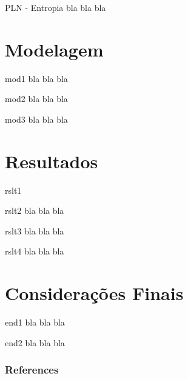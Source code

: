 \documentclass{beamer}
\begin{document}
    \begin{frame}{PLN - Entropia}
        bla bla bla
    \end{frame}

\section{Modelagem}
    \begin{frame}{mod1}
        bla bla bla
    \end{frame}

    \begin{frame}{mod2}
        bla bla bla
    \end{frame}

    \begin{frame}{mod3}
        bla bla bla
    \end{frame}


\section{Resultados}
    \begin{frame}{rslt1}
        \citep{agarwala2017}
    \end{frame}
    
    \begin{frame}{rslt2}
        bla bla bla
    \end{frame}
    
    \begin{frame}{rslt3}
        bla bla bla
    \end{frame}
    
    \begin{frame}{rslt4}
        bla bla bla
    \end{frame}


\section{Considerações Finais}
    \begin{frame}{end1}
        bla bla bla
    \end{frame}
    
    \begin{frame}{end2}
        bla bla bla
    \end{frame}

%
    \begin{frame}[allowframebreaks]
        \frametitle{References}
        
        
        
    \end{frame}
\end{document}

